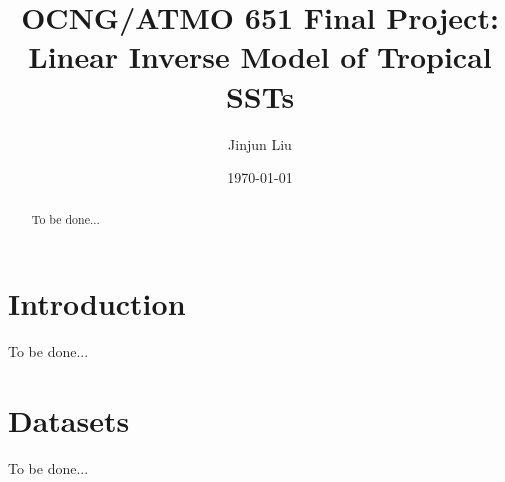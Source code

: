 \documentclass[12pt,a4paper]{article}
\title{\huge{\textbf{OCNG/ATMO 651 Final Project: Linear Inverse Model of Tropical SSTs}}}
\author{Jinjun Liu}
\date{\today}
\begin{document}
\maketitle
\thispagestyle{empty}
\begin{abstract}

    To be done...

\end{abstract}

\tableofcontents

\clearpage %

\section{Introduction} %

    To be done...

\section{Datasets}\label{datasets}

    To be done...
\end{document}
